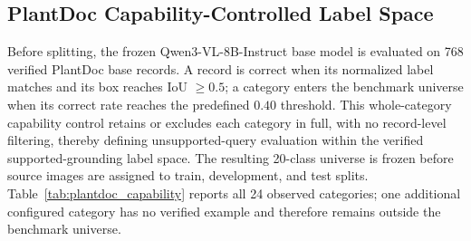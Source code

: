 \documentclass[letterpaper]{article}
\begin{document}
\subsection{PlantDoc Capability-Controlled Label Space}
\label{sec:plantdoc_capability}

Before splitting, the frozen Qwen3-VL-8B-Instruct base model is evaluated on 768 verified PlantDoc base records. A record is correct when its normalized label matches and its box reaches IoU $\geq0.5$; a category enters the benchmark universe when its correct rate reaches the predefined $0.40$ threshold. This whole-category capability control retains or excludes each category in full, with no record-level filtering, thereby defining unsupported-query evaluation within the verified supported-grounding label space. The resulting 20-class universe is frozen before source images are assigned to train, development, and test splits. Table~\ref{tab:plantdoc_capability} reports all 24 observed categories; one additional configured category has no verified example and therefore remains outside the benchmark universe.
\end{document}

